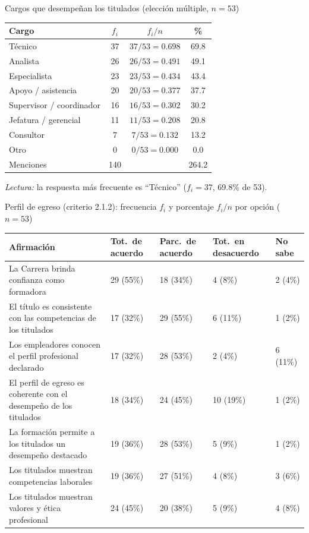 \begin{mitabla}{Cargos que desempeñan los titulados (elección múltiple, $n=53$)}
\begin{tabular}{lccc}
\toprule
Cargo & $f_i$ & $f_i / n$ & \% \\
\midrule
Técnico & 37 & $37/53 = 0.698$ & 69.8 \\
Analista & 26 & $26/53 = 0.491$ & 49.1 \\
Especialista & 23 & $23/53 = 0.434$ & 43.4 \\
Apoyo / asistencia & 20 & $20/53 = 0.377$ & 37.7 \\
Supervisor / coordinador & 16 & $16/53 = 0.302$ & 30.2 \\
Jefatura / gerencial & 11 & $11/53 = 0.208$ & 20.8 \\
Consultor & 7 & $7/53 = 0.132$ & 13.2 \\
Otro & 0 & $0/53 = 0.000$ & 0.0 \\
\midrule
Menciones & 140 & & 264.2 \\
\bottomrule
\end{tabular}
\end{mitabla}

\textit{Lectura:} la respuesta más frecuente es ``Técnico'' ($f_i = 37$, 69.8\% de 53).

\begin{mitabla}{Perfil de egreso (criterio 2.1.2): frecuencia $f_i$ y porcentaje $f_i/n$ por opción ($n=53$)}
\begin{tabular}{L{5.6cm}C{2.0cm}C{2.0cm}C{2.1cm}C{1.5cm}}
\toprule
Afirmación & Tot.\ de acuerdo & Parc.\ de acuerdo & Tot.\ en desacuerdo & No sabe \\
\midrule
La Carrera brinda confianza como formadora & 29 (55\%) & 18 (34\%) & 4 (8\%) & 2 (4\%) \\
El título es consistente con las competencias de los titulados & 17 (32\%) & 29 (55\%) & 6 (11\%) & 1 (2\%) \\
Los empleadores conocen el perfil profesional declarado & 17 (32\%) & 28 (53\%) & 2 (4\%) & 6 (11\%) \\
El perfil de egreso es coherente con el desempeño de los titulados & 18 (34\%) & 24 (45\%) & 10 (19\%) & 1 (2\%) \\
La formación permite a los titulados un desempeño destacado & 19 (36\%) & 28 (53\%) & 5 (9\%) & 1 (2\%) \\
Los titulados muestran competencias laborales & 19 (36\%) & 27 (51\%) & 4 (8\%) & 3 (6\%) \\
Los titulados muestran valores y ética profesional & 24 (45\%) & 20 (38\%) & 5 (9\%) & 4 (8\%) \\
\bottomrule
\end{tabular}
\end{mitabla}

